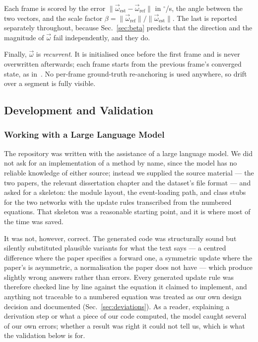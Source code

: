 \documentclass[journal]{IEEEtran}
\newcommand{\wvec}{\vec{\omega}}
\begin{document}
Each frame is scored by the error $\|\wvec_{\text{est}}-\wvec_{\text{ref}}\|$ in
$^\circ$/s, the angle between the two vectors, and the scale factor
$\beta = \|\wvec_{\text{ref}}\| / \|\wvec_{\text{est}}\|$. The last is reported
separately throughout, because Sec.~\ref{sec:beta} predicts that the direction
and the magnitude of $\wvec$ fail independently, and they do.

Finally, $\wvec$ is \emph{recurrent}. It is initialised once before the first
frame and is never overwritten afterwards; each frame starts from the previous
frame's converged state, as in~\cite{cook2011}. No per-frame ground-truth
re-anchoring is used anywhere, so drift over a segment is fully visible.

\subsection{Development and Validation}

\subsubsection{Working with a Large Language Model}
The repository was written with the assistance of a large language model. We
did not ask for an implementation of a method by name, since the model has no
reliable knowledge of either source; instead we supplied the source material
--- the two papers, the relevant dissertation chapter and the dataset's file
format --- and asked for a skeleton: the module layout, the event-loading path,
and class stubs for the two networks with the update rules transcribed from the
numbered equations. That skeleton was a reasonable starting point, and it is
where most of the time was saved.

It was not, however, correct. The generated code was structurally sound but
silently substituted plausible variants for what the text says --- a centred
difference where the paper specifies a forward one, a symmetric update where the
paper's is asymmetric, a normalisation the paper does not have --- which produce
slightly wrong answers rather than errors. Every generated update rule was
therefore checked line by line against the equation it claimed to implement,
and anything not traceable to a numbered equation was treated as our own design
decision and documented (Sec.~\ref{sec:deviations}). As a reader, explaining a
derivation step or what a piece of our code computed, the model caught several
of our own errors; whether a result was right it could not tell us, which is
what the validation below is for.
\end{document}
